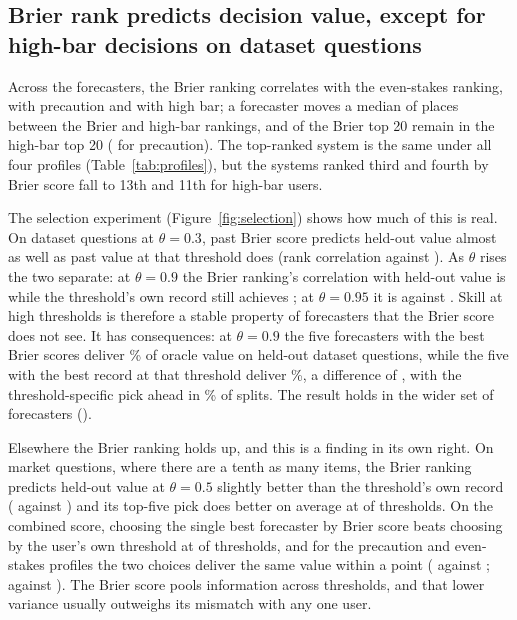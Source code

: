 \documentclass[10pt]{article}
\begin{document}
\subsection{Brier rank predicts decision value, except for high-bar decisions on dataset questions}\label{sec:rank}
Across the \nCand{} forecasters, the Brier ranking correlates \rhoEven{} with the even-stakes ranking, \rhoPre{} with precaution and \rhoHigh{} with high bar; a forecaster moves a median of \moveHigh{} places between the Brier and high-bar rankings, and \keepHigh{} of the Brier top 20 remain in the high-bar top 20 (\keepPre{} for precaution). The top-ranked system is the same under all four profiles (Table~\ref{tab:profiles}), but the systems ranked third and fourth by Brier score fall to 13th and 11th for high-bar users.

The selection experiment (Figure~\ref{fig:selection}) shows how much of this is real. On dataset questions at $\theta=0.3$, past Brier score predicts held-out value almost as well as past value at that threshold does (rank correlation \rhoBMid{} against \rhoOMid). As $\theta$ rises the two separate: at $\theta=0.9$ the Brier ranking's correlation with held-out value is \rhoBNinety{} while the threshold's own record still achieves \rhoONinety; at $\theta=0.95$ it is \rhoBNinetyFive{} against \rhoONinetyFive. Skill at high thresholds is therefore a stable property of forecasters that the Brier score does not see. It has consequences: at $\theta=0.9$ the five forecasters with the best Brier scores deliver \pickB\% of oracle value on held-out dataset questions, while the five with the best record at that threshold deliver \pickO\%, a difference of \pickDiff, with the threshold-specific pick ahead in \pickPOwn\% of splits. The result holds in the wider set of \nCandWide{} forecasters (\pickDiffWide).

Elsewhere the Brier ranking holds up, and this is a finding in its own right. On market questions, where there are a tenth as many items, the Brier ranking predicts held-out value at $\theta=0.5$ slightly better than the threshold's own record (\rhoBMarket{} against \rhoOMarket) and its top-five pick does better on average at \brierWinsMarket{} of \nSelThetas{} thresholds. On the combined score, choosing the single best forecaster by Brier score beats choosing by the user's own threshold at \brierWinsOverall{} of \nSelThetas{} thresholds, and for the precaution and even-stakes profiles the two choices deliver the same value within a point (\selPreB{} against \selPreO; \selEvenB{} against \selEvenO). The Brier score pools information across thresholds, and that lower variance usually outweighs its mismatch with any one user.
\end{document}
